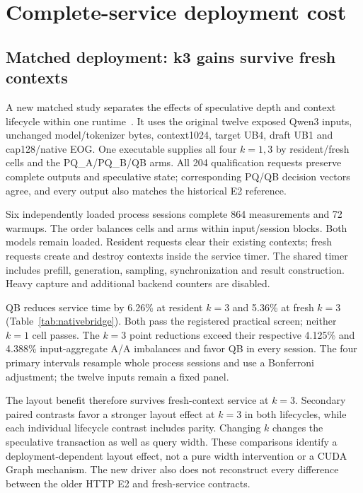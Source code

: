 \section{Complete-service deployment cost}
\label{sec:deployment}
\subsection{Matched deployment: k3 gains survive fresh contexts}
\label{sec:matchedbridge}
A new matched study separates the effects of speculative depth and context lifecycle within one runtime~\cite{rtxnativebridge}. It uses the original twelve exposed Qwen3 inputs, unchanged model/tokenizer bytes, context1024, target UB4, draft UB1 and cap128/native EOG. One executable supplies all four $k=1,3$ by resident/fresh cells and the PQ\_A/PQ\_B/QB arms. All 204 qualification requests preserve complete outputs and speculative state; corresponding PQ/QB decision vectors agree, and every output also matches the historical E2 reference.

Six independently loaded process sessions complete 864 measurements and 72 warmups. The order balances cells and arms within input/session blocks. Both models remain loaded. Resident requests clear their existing contexts; fresh requests create and destroy contexts inside the service timer. The shared timer includes prefill, generation, sampling, synchronization and result construction. Heavy capture and additional backend counters are disabled.



QB reduces service time by 6.26\% at resident $k=3$ and 5.36\% at fresh $k=3$ (Table~\ref{tab:nativebridge}). Both pass the registered practical screen; neither $k=1$ cell passes. The $k=3$ point reductions exceed their respective 4.125\% and 4.388\% input-aggregate A/A imbalances and favor QB in every session. The four primary intervals resample whole process sessions and use a Bonferroni adjustment; the twelve inputs remain a fixed panel.

The layout benefit therefore survives fresh-context service at $k=3$. Secondary paired contrasts favor a stronger layout effect at $k=3$ in both lifecycles, while each individual lifecycle contrast includes parity. Changing $k$ changes the speculative transaction as well as query width. These comparisons identify a deployment-dependent layout effect, not a pure width intervention or a CUDA Graph mechanism. The new driver also does not reconstruct every difference between the older HTTP E2 and fresh-service contracts.

